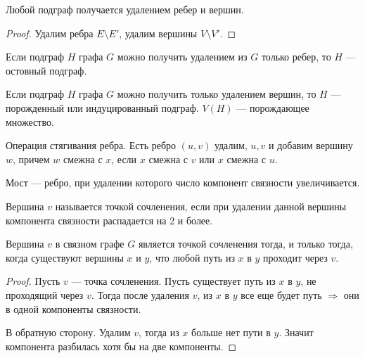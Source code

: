 \begin{statement}
    Любой подграф получается удалением ребер и вершин.
\end{statement}
\begin{proof}
    Удалим ребра $E \setminus E'$, удалим вершины  $V \setminus V'$. 
\end{proof}
\begin{definition}
    Если подграф $H$ графа  $G$ можно получить удалением из  $G$ только ребер, то  $H$ --- остовный подграф.
\end{definition}
\begin{definition}
    Если подграф $H$ графа  $G$ можно получить только удалением вершин, то  $H$ --- порожденный или индуцированный подграф.  $V(H)$ --- порождающее множество.
\end{definition}
\begin{definition}
    Операция стягивания ребра. Есть ребро $(u, v)$ удалим, $u, v$ и добавим вершину  $w$, причем  $w$ смежна с  $x$, если  $x$ смежна с  $v$ или  $x$ смежна с  $u$.
\end{definition}
\begin{definition}
    Мост --- ребро, при удалении которого число компонент связности увеличивается.
\end{definition}
\begin{definition}
    Вершина $v$ называется точкой сочленения, если при удалении данной вершины компонента связности распадается на 2 и более.
\end{definition}
\begin{statement}
    Вершина $v$ в связном графе  $G$ является точкой сочленения тогда, и только тогда, когда существуют вершины  $x$ и  $y$, что любой путь из  $x$ в  $y$ проходит через $v$.
\end{statement}
\begin{proof}
    Пусть $v$ --- точка сочленения. Пусть существует путь из  $x$ в  $y$, не проходящий через  $v$. Тогда после удаления  $v$, из  $x$ в  $y$ все еще будет путь  $\Rightarrow$ они в одной компоненты связности.

    В обратную сторону. Удалим $v$, тогда из  $x$ больше нет пути в  $y$. Значит компонента разбилась хотя бы на две компоненты.
\end{proof}

